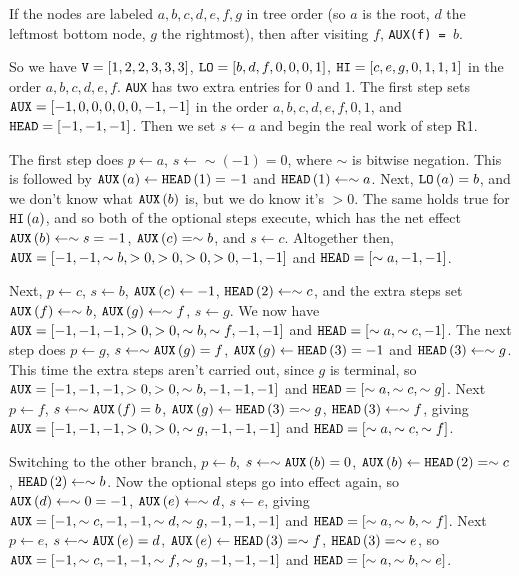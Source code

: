 If the nodes are labeled $a, b, c, d, e, f, g$ in tree order (so $a$ is the
root, $d$ the leftmost bottom node, $g$ the rightmost), then after
visiting $f$, {\tt AUX(f) = }$b$.

So we have ${\tt V} = \left[1, 2, 2, 3, 3, 3\right]$, ${\tt LO} = \left[b, d, f, 0, 0, 0, 1\right]$,
${\tt HI} = \left[c, e, g, 0, 1, 1, 1\right]$ in the order $a, b, c, d, e, f$.
{\tt AUX} has two extra entries for 0 and 1.  The first step sets
${\tt AUX} = \left[-1, 0, 0, 0, 0, 0, -1, -1\right]$ in the order $a, b, c, d, e, f, 0, 1$,
and ${\tt HEAD} = \left[-1, -1, -1\right]$.  Then we set $s \gets a$ and begin
the real work of step R1.

The first step does $p \gets a$, $s \gets \sim \left(-1\right) = 0$, where $\sim$
is bitwise negation.   This is followed by ${\tt AUX}\left(a\right) \gets {\tt HEAD}\left(1\right) = -1$
and ${\tt HEAD}\left(1\right) \gets \sim a$.  Next, ${\tt LO}\left(a\right) = b$,
and we don't know what ${\tt AUX}\left(b\right)$ is, but we do know it's $>0$.
The same holds true for ${\tt HI}\left(a\right)$, and so both of the optional steps
execute, which has the net effect  ${\tt AUX}\left(b\right) \gets \sim s = -1$,
${\tt AUX}\left(c\right) = \sim b$, and $s \gets c$.  Altogether then,
${\tt AUX} = \left[ -1, -1, \sim b, >0, >0, >0, >0, -1, -1\right]$
and ${\tt HEAD} = \left[\sim a, -1, -1\right]$.

Next, $p \gets c$, $s \gets b$, ${\tt AUX}\left(c\right) \gets -1$, ${\tt HEAD}\left(2\right) \gets
\sim c$, and the extra steps set ${\tt AUX}\left(f\right) \gets \sim b$,
${\tt AUX}\left(g\right) \gets \sim f$, $s \gets g$.  We now have
${\tt AUX} = \left[ -1, -1, -1, >0, >0, \sim b, \sim f, -1, -1\right]$
and ${\tt HEAD} = \left[\sim a, \sim c, -1\right]$.  The next step does
$p \gets g$, $s \gets \sim {\tt AUX}\left(g\right) = f$, ${\tt AUX}\left(g\right)
\gets {\tt HEAD}\left(3\right) = -1$ and ${\tt HEAD}\left(3\right) \gets \sim g$.
This time the extra steps aren't carried out, since $g$ is terminal, so
${\tt AUX} = \left[ -1, -1, -1, >0, >0, \sim b, -1, -1, -1\right]$
and ${\tt HEAD} = \left[\sim a, \sim c, \sim g\right]$.  Next $p \gets f$,
$s \gets \sim {\tt AUX}\left(f\right) = b$, ${\tt AUX}\left(g\right) \gets
{\tt HEAD}\left(3\right) = \sim g$, ${\tt HEAD}\left(3\right) \gets \sim f$,
giving ${\tt AUX} = \left[ -1, -1, -1, >0, >0, \sim g, -1, -1, -1\right]$
and ${\tt HEAD} = \left[\sim a, \sim c, \sim f\right]$.

Switching to the other branch, $p \gets b$, $s \gets \sim {\tt AUX}\left(b\right) = 0$,
${\tt AUX}\left(b\right) \gets {\tt HEAD}\left(2\right) = \sim c$, ${\tt HEAD}\left(2\right)
\gets \sim b$.  Now the optional steps go into effect again, so ${\tt AUX}\left(d\right)
\gets \sim 0 = -1$, ${\tt AUX}\left(e\right) \gets \sim d$, $s \gets e$, giving
${\tt AUX} = \left[ -1, \sim c, -1, -1, \sim d, \sim g, -1, -1, -1\right]$
and ${\tt HEAD} = \left[\sim a, \sim b, \sim f\right]$.  Next $p \gets e$,
$s \gets \sim {\tt AUX}\left(e\right) = d$, ${\tt AUX}\left(e\right) \gets
{\tt HEAD}\left(3\right) = \sim f$, ${\tt HEAD}\left(3\right) = \sim e$,
so ${\tt AUX} = \left[ -1, \sim c, -1, -1, \sim f, \sim g, -1, -1, -1\right]$
and ${\tt HEAD} = \left[\sim a, \sim b, \sim e\right]$.

